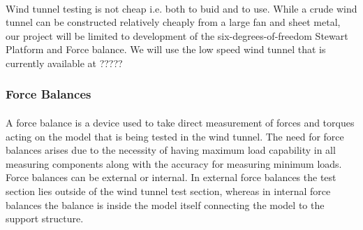 \paragraph{}Wind tunnel testing is not cheap i.e. both to buid and to use. While a crude wind tunnel can be constructed relatively cheaply from a large fan and
sheet metal, our project will be limited to development of the six-degrees-of-freedom Stewart Platform and Force balance. We will use the low speed wind tunnel that is currently available at ?????
\subsubsection{Force Balances}
\paragraph{}A force balance is a device used to take direct measurement of forces and torques acting on the model that is being tested in the wind tunnel. The need for
force balances arises due to the necessity of having maximum load capability in all measuring components along with the accuracy for measuring minimum loads. Force balances can be external or internal. In external force balances the test section lies outside of the wind tunnel test section, whereas in internal force balances the balance is inside the model itself connecting the model to the support structure.
\cite{fernandes_design_nodate}
